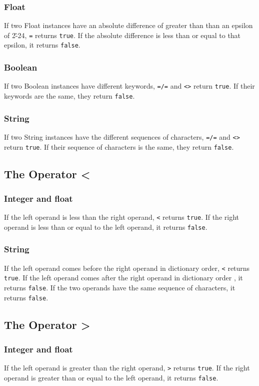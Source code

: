 \subsubsection{Float}
If two Float instances have an absolute difference of greater than than an epsilon of 2\^{-24}, \verb!=! returns \verb!true!. If the absolute difference is less than or equal to that epsilon, it returns \verb!false!.
\subsubsection{Boolean}
If two Boolean instances have different keywords, \verb!=/=! and \verb!<>! return \verb!true!. If their keywords are the same, they return \verb!false!.
\subsubsection{String}
If two String instances have the different sequences of characters, \verb!=/=! and \verb!<>! return \verb!true!. If their sequence of characters is the same, they return \verb!false!.

\subsection{The Operator <}
\subsubsection{Integer and float}
If the left operand is less than the right operand, \verb!<! returns \verb!true!. If the right operand is less than or equal to the left operand, it returns \verb!false!.
\subsubsection{String}
If the left operand comes before the right operand in dictionary order, \verb!<! returns \verb!true!. If the left operand comes after the right operand in dictionary order , it returns \verb!false!. If the two operands have the same sequence of characters, it returns \verb!false!.

\subsection{The Operator >}
\subsubsection{Integer and float}
If the left operand is greater than the right operand, \verb!>! returns \verb!true!. If the right operand is greater than or equal to the left operand, it returns \verb!false!.
